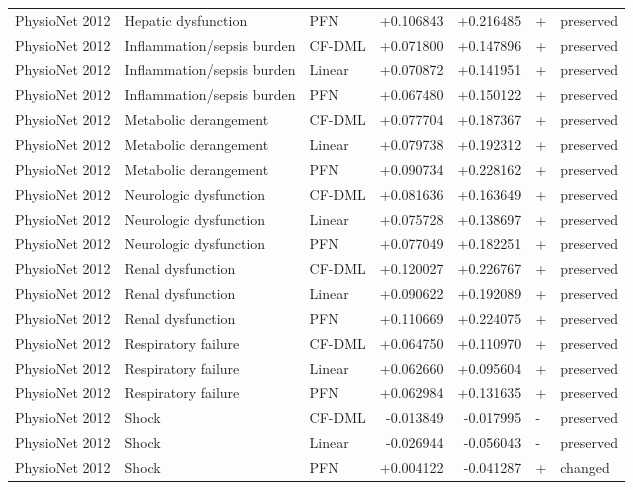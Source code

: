 \begin{longtable}{@{}p{0.78in}p{1.18in}p{0.56in}rrlp{0.62in}@{}}
PhysioNet 2012 & Hepatic dysfunction & PFN & +0.106843 & +0.216485 & + & preserved\\
PhysioNet 2012 & Inflammation/sepsis burden & CF-DML & +0.071800 & +0.147896 & + & preserved\\
PhysioNet 2012 & Inflammation/sepsis burden & Linear & +0.070872 & +0.141951 & + & preserved\\
PhysioNet 2012 & Inflammation/sepsis burden & PFN & +0.067480 & +0.150122 & + & preserved\\
PhysioNet 2012 & Metabolic derangement & CF-DML & +0.077704 & +0.187367 & + & preserved\\
PhysioNet 2012 & Metabolic derangement & Linear & +0.079738 & +0.192312 & + & preserved\\
PhysioNet 2012 & Metabolic derangement & PFN & +0.090734 & +0.228162 & + & preserved\\
PhysioNet 2012 & Neurologic dysfunction & CF-DML & +0.081636 & +0.163649 & + & preserved\\
PhysioNet 2012 & Neurologic dysfunction & Linear & +0.075728 & +0.138697 & + & preserved\\
PhysioNet 2012 & Neurologic dysfunction & PFN & +0.077049 & +0.182251 & + & preserved\\
PhysioNet 2012 & Renal dysfunction & CF-DML & +0.120027 & +0.226767 & + & preserved\\
PhysioNet 2012 & Renal dysfunction & Linear & +0.090622 & +0.192089 & + & preserved\\
PhysioNet 2012 & Renal dysfunction & PFN & +0.110669 & +0.224075 & + & preserved\\
PhysioNet 2012 & Respiratory failure & CF-DML & +0.064750 & +0.110970 & + & preserved\\
PhysioNet 2012 & Respiratory failure & Linear & +0.062660 & +0.095604 & + & preserved\\
PhysioNet 2012 & Respiratory failure & PFN & +0.062984 & +0.131635 & + & preserved\\
PhysioNet 2012 & Shock & CF-DML & -0.013849 & -0.017995 & - & preserved\\
PhysioNet 2012 & Shock & Linear & -0.026944 & -0.056043 & - & preserved\\
PhysioNet 2012 & Shock & PFN & +0.004122 & -0.041287 & + & changed\\
\bottomrule \end{longtable}
